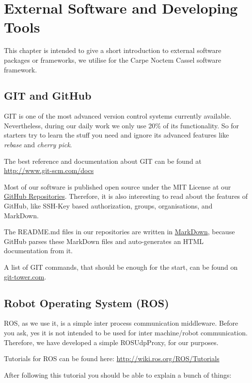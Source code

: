 \chapter{External Software and Developing Tools}
\label{chap:ExtSoftware}

This chapter is intended to give a short introduction to external software packages or frameworks, we utilise for the Carpe Noctem Cassel software framework.

\section{GIT and GitHub}
\label{sec:Git}

GIT is one of the most advanced version control systems currently available. Nevertheless, during our daily work we only use 20\% of its functionality. So for starters try to learn the stuff you need and ignore its advanced features like \emph{rebase} and \emph{cherry pick}.

The best reference and documentation about GIT can be found at \url{http://www.git-scm.com/docs}

Most of our software is published open source under the MIT License at our \href{https://github.com/carpe-noctem-cassel}{GitHub Repositories}. Therefore, it is also interesting to read about the features of GitHub, like SSH-Key based authorization, groups, organisations, and MarkDown.

The README.md files in our repositories are written in \href{https://en.wikipedia.org/wiki/Markdown}{MarkDown}, because GitHub parses these MarkDown files and auto-generates an HTML documentation from it.

A list of GIT commands, that should be enough for the start, can be found on \href{https://www.git-tower.com/blog/git-cheat-sheet/}{git-tower.com}.

\section{Robot Operating System (ROS)}
\label{sec:ROS}

ROS, as we use it, is a simple inter process communication middleware. Before you ask, yes it is not intended to be used for inter machine/robot communication. Therefore, we have developed a simple ROSUdpProxy, for our purposes. 

Tutorials for ROS can be found here: \url{http://wiki.ros.org/ROS/Tutorials}

After following this tutorial you should be able to explain a bunch of things:

